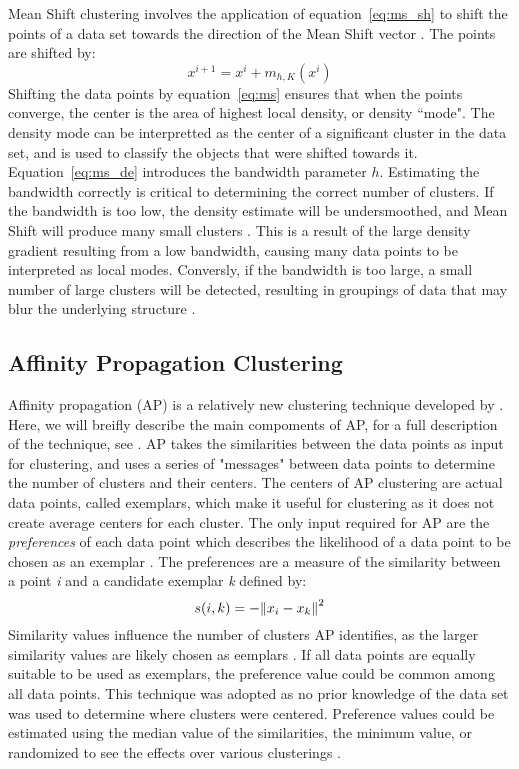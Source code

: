 Mean Shift clustering involves the application of equation~\ref{eq:ms_sh} to shift the points of a data set towards the direction of the Mean Shift vector \citet{vatturi09}. 
The points are shifted by: 
\begin{equation}
\label{eq:ms}
x^{i+1} = x^i + m_{h,K}(x^i)
\end{equation}
Shifting the data points by equation~\ref{eq:ms} ensures that when the points converge, the center is the area of highest local density, or density ``mode". 
The density mode can be interpretted as the center of a significant cluster in the data set, and is used to classify the objects that were shifted towards it.
Equation~\ref{eq:ms_de} introduces the bandwidth parameter $h$. 
Estimating the bandwidth correctly is critical to determining the correct number of clusters.
If the bandwidth is too low, the density estimate will be undersmoothed, and Mean Shift will produce many small clusters \citet{vatturi09}. This is a result of the large density gradient resulting from a low bandwidth, causing many data points to be interpreted as local modes.
Conversly, if the bandwidth is too large, a small number of large clusters will be detected, resulting in groupings of data that may blur the underlying structure \citet{vatturi09}.

\subsection{Affinity Propagation Clustering}

Affinity propagation (AP) is a relatively new clustering technique developed by \citet{frey07}.
Here, we will breifly describe the main compoments of AP, for a full description of the technique, see \citet{frey07}.
AP takes the similarities between the data points as input for clustering, and uses a series of "messages" between data points to determine the number of clusters and their centers.
The centers of AP clustering are actual data points, called exemplars, which make it useful for clustering as it does not create average centers for each cluster. 
The only input required for AP  are the \textit{preferences} of each data point which describes the likelihood of a data point to be chosen as an exemplar \citet{frey07}.
The preferences are a measure of the similarity between a point \textit{i} and a candidate exemplar \textit{k} defined by: 
\begin{equation}
\label{eq:sim}
s(i,k) = -\norm{x_i - x_k}^2
\end{equation}
Similarity values influence the number of clusters AP identifies, as the larger similarity values are likely chosen as eemplars \citet{frey07}.
If all data points are equally suitable to be used as exemplars, the preference value could be common among all data points. This technique was adopted as no prior knowledge of the data set was used to determine where clusters were centered. 
Preference values could be estimated using the median value of the similarities, the minimum value, or randomized to see the effects over various clusterings \citet{frey07}.

